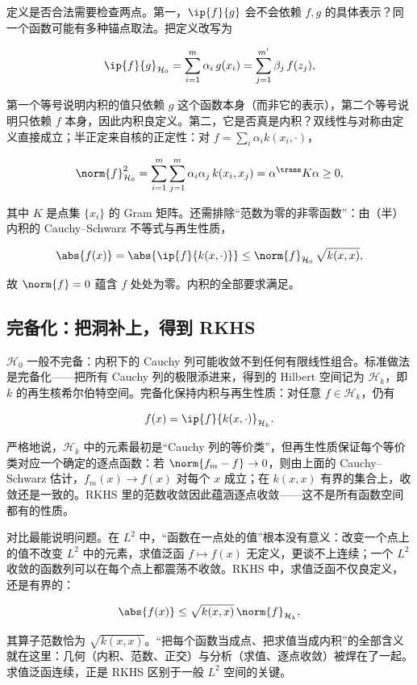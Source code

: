 定义是否合法需要检查两点。第一，\(\ip{f}{g}\) 会不会依赖 \(f,g\) 的具体表示？同一个函数可能有多种锚点取法。把定义改写为

\[
\ip{f}{g}_{\mathcal{H}_0}
=\sum_{i=1}^{m}\alpha_i\,g(x_i)
=\sum_{j=1}^{m'}\beta_j\,f(z_j),
\]

第一个等号说明内积的值只依赖 \(g\) 这个函数本身（而非它的表示），第二个等号说明只依赖 \(f\) 本身，因此内积良定义。第二，它是否真是内积？双线性与对称由定义直接成立；半正定来自核的正定性：对 \(f=\sum_i\alpha_i k(x_i,\cdot)\)，

\[
\norm{f}_{\mathcal{H}_0}^{2}
=\sum_{i=1}^{m}\sum_{j=1}^{m}\alpha_i\alpha_j\,k(x_i,x_j)
=\alpha^{\trans}K\alpha\ge0,
\]

其中 \(K\) 是点集 \(\{x_i\}\) 的 Gram 矩阵。还需排除``范数为零的非零函数''：由（半）内积的 Cauchy--Schwarz 不等式与再生性质，

\[
\abs{f(x)}
=\abs{\ip{f}{k(x,\cdot)}}
\le\norm{f}_{\mathcal{H}_0}\,\sqrt{k(x,x)},
\]

故 \(\norm{f}=0\) 蕴含 \(f\) 处处为零。内积的全部要求满足。

\subsection{完备化：把洞补上，得到 RKHS}

\(\mathcal{H}_0\) 一般不完备：内积下的 Cauchy 列可能收敛不到任何有限线性组合。标准做法是完备化——把所有 Cauchy 列的极限添进来，得到的 Hilbert 空间记为 \(\mathcal{H}_k\)，即 \(k\) 的再生核希尔伯特空间。完备化保持内积与再生性质：对任意 \(f\in\mathcal{H}_k\)，仍有

\[
f(x)=\ip{f}{k(x,\cdot)}_{\mathcal{H}_k}.
\]

严格地说，\(\mathcal{H}_k\) 中的元素最初是``Cauchy 列的等价类''，但再生性质保证每个等价类对应一个确定的逐点函数：若 \(\norm{f_m-f}\to0\)，则由上面的 Cauchy--Schwarz 估计，\(f_m(x)\to f(x)\) 对每个 \(x\) 成立；在 \(k(x,x)\) 有界的集合上，收敛还是一致的。RKHS 里的范数收敛因此蕴涵逐点收敛——这不是所有函数空间都有的性质。

对比最能说明问题。在 \(L^2\) 中，``函数在一点处的值''根本没有意义：改变一个点上的值不改变 \(L^2\) 中的元素，求值泛函 \(f\mapsto f(x)\) 无定义，更谈不上连续；一个 \(L^2\) 收敛的函数列可以在每个点上都震荡不收敛。RKHS 中，求值泛函不仅良定义，还是有界的：

\[
\abs{f(x)}\le\sqrt{k(x,x)}\,\norm{f}_{\mathcal{H}_k},
\]

其算子范数恰为 \(\sqrt{k(x,x)}\)。``把每个函数当成点、把求值当成内积''的全部含义就在这里：几何（内积、范数、正交）与分析（求值、逐点收敛）被焊在了一起。求值泛函连续，正是 RKHS 区别于一般 \(L^2\) 空间的关键。

